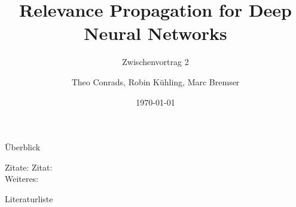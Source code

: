 \documentclass[t, compress]{beamer}
\title{Relevance Propagation for Deep Neural Networks}
\subtitle{Zwischenvortrag 2}
\author{Theo Conrads, Robin K\"uhling, Marc Bremser}
\date{\today}
\begin{document}
\begin{frame}
	\titlepage
\end{frame}

\begin{frame}{Überblick}
  \tableofcontents[hideallsubsections]
\end{frame}













\begin{frame}{Zitate:}
Zitat: \cite{binder} \\
Weiteres: \cite{montavon}
\end{frame}


\begin{frame}{Literaturliste}
\color{unikoelndarkgray}
%





\end{frame}
\end{document}
